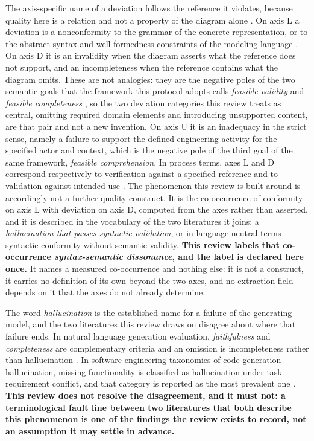 The axis-specific name of a deviation follows the reference it violates, because quality here is a relation and not a property of the diagram alone \cite{Lindland1994Quality,Krogstie2006Process}. On axis L a deviation is a nonconformity to the grammar of the concrete representation, or to the abstract syntax and well-formedness constraints of the modeling language \cite{OMG2017UML}. On axis D it is an invalidity when the diagram asserts what the reference does not support, and an incompleteness when the reference contains what the diagram omits. These are not analogies: they are the negative poles of the two semantic goals that the framework this protocol adopts calls \textit{feasible validity} and \textit{feasible completeness} \cite{Lindland1994Quality}, so the two deviation categories this review treats as central, omitting required domain elements and introducing unsupported content, are that pair and not a new invention. On axis U it is an inadequacy in the strict sense, namely a failure to support the defined engineering activity for the specified actor and context, which is the negative pole of the third goal of the same framework, \textit{feasible comprehension}. In process terms, axes L and D correspond respectively to verification against a specified reference and to validation against intended use \cite{ISO12207}. The phenomenon this review is built around is accordingly not a further quality construct. It is the co-occurrence of conformity on axis L with deviation on axis D, computed from the axes rather than asserted, and it is described in the vocabulary of the two literatures it joins: a \textit{hallucination that passes syntactic validation}, or in language-neutral terms syntactic conformity without semantic validity. \textbf{This review labels that co-occurrence \textit{syntax-semantic dissonance}, and the label is declared here once.} It names a measured co-occurrence and nothing else: it is not a construct, it carries no definition of its own beyond the two axes, and no extraction field depends on it that the axes do not already determine.

The word \textit{hallucination} is the established name for a failure of the generating model, and the two literatures this review draws on disagree about where that failure ends. In natural language generation evaluation, \textit{faithfulness} and \textit{completeness} are complementary criteria and an omission is incompleteness rather than hallucination \cite{Ji2023Hallucination,Maynez2020Faithfulness}. In software engineering taxonomies of code-generation hallucination, missing functionality is classified as hallucination under task requirement conflict, and that category is reported as the most prevalent one \cite{Liu2024CodeHallucination,Zhang2025CodeHallucination,Lee2025HallucinationTaxonomy}. \textbf{This review does not resolve the disagreement, and it must not: a terminological fault line between two literatures that both describe this phenomenon is one of the findings the review exists to record, not an assumption it may settle in advance.}


